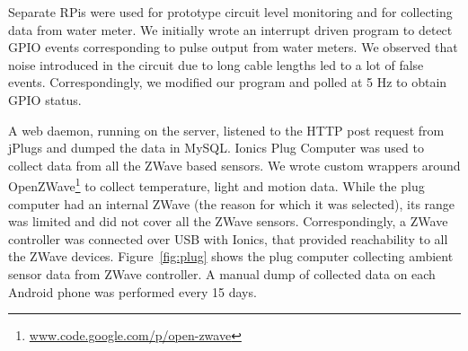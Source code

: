\documentclass[10pt]{sensys-proc}
\newcommand{\figref}[1]{Figure~\ref{#1}}
\newcommand{\secref}[1]{Section~\ref{#1}}
\newcommand{\paradigm}{Sense-Local Store-Upload}
\newcommand{\selstup}{SeLStUp}
\begin{document}
Separate RPis were used for prototype circuit level monitoring and for collecting data from water meter. %
We initially wrote an interrupt driven program to detect GPIO events corresponding to pulse output from water meters. We observed that noise introduced in the circuit due to long cable lengths led to a lot of false events. Correspondingly, we modified our program and polled at 5 Hz to obtain GPIO status. %

A web daemon, running on the server, listened to the HTTP post request from jPlugs and dumped the data in MySQL. Ionics Plug Computer was used to collect data from all the ZWave based sensors. We wrote custom wrappers around OpenZWave\footnote{\url{www.code.google.com/p/open-zwave}} to collect temperature, light and motion data. While the plug computer had an internal ZWave (the reason for which it was selected), its range was limited and did not cover all the ZWave sensors. Correspondingly, a ZWave controller was connected over USB with Ionics, that provided reachability to all the ZWave devices. %
\figref{fig:plug} shows the plug computer collecting ambient sensor data from ZWave controller. A manual dump of collected data on each Android phone was performed every 15 days.


\end{document}
